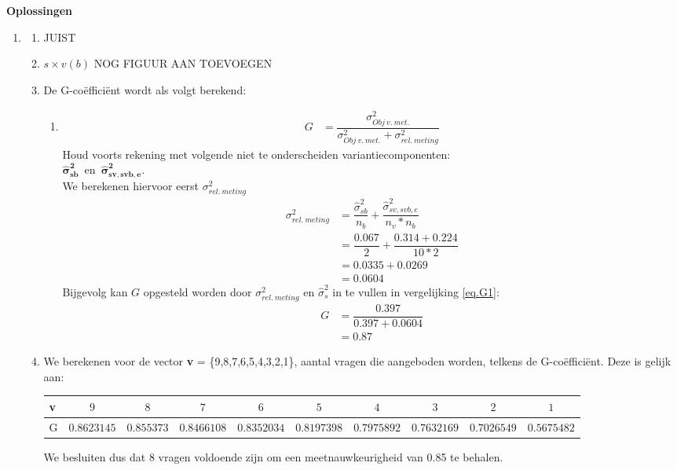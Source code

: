 \OPLOSSING
{
\textbf{Oplossingen}
\begin{enumerate}

\item
\begin{enumerate}
\item JUIST
\item $s \times v(b)$ NOG FIGUUR AAN TOEVOEGEN
\item De G-co\"{e}ffici\"{e}nt wordt als volgt berekend:
\begin{enumerate}
	\item
	\begin{align}
		G &=\dfrac{\sigma^2_{Obj~v.~met.}}{\sigma^2_{Obj~v.~met.}+ \sigma^2_{rel.~meting}} \label{eq.G1}
	\end{align}
	Houd voorts rekening met volgende niet te onderscheiden variantiecomponenten:~ \\
	$ \bm{\hat{\sigma}^2_{sb}} $~en~$\bm{\hat{\sigma}^2_{sv, svb, e} }$.\\
  We berekenen hiervoor eerst $\sigma^2_{rel.~meting}$
  \begin{align*}
    \sigma^2_{rel.~meting} 	&=  \dfrac{\hat{\sigma}^2_{sb}}{n_b} + \dfrac{\hat{\sigma}^2_{sv,svb,e}}{n_v*n_b} \\
                &=  \dfrac{{0.067}}{2} + \dfrac{{0.314 + 0.224}}{10*2}\\
                &= 0.0335 + 0.0269 \\
                &= 0.0604
  \end{align*}
  Bijgevolg kan $G$ opgesteld worden door $\sigma^2_{rel.~meting}$ en $\hat{\sigma}^2_{s}$ in te vullen in vergelijking \ref{eq.G1}:
  \begin{align*}
    G 	&=\dfrac{0.397}{0.397 + 0.0604}\\
      &=0.87
  \end{align*}
\end{enumerate}
\item We berekenen voor de vector \textbf{v} = \{9,8,7,6,5,4,3,2,1\}, aantal vragen die aangeboden worden, telkens de G-co\"{e}ffici\"{e}nt. Deze is gelijk aan:

\begin{center}
\renewcommand{\arraystretch}{1.2}
\hspace*{-3 cm}
\begin{tabular}{|l|c|c|c|c|c|c|c|c|c|} \hline
 \textbf{v} & $ 9 $ & $ 8 $& $ 7 $ & $ 6 $ & $ 5 $ & $ 4 $ & $ 3 $ & $ 2 $ & $ 1 $ \\ \hline
G  & 0.$8623145$ & $0.855373$ & $0.8466108$ & $0.8352034$ & $0.8197398$ & $0.7975892$ & $0.7632169$ & $0.7026549$ & $0.5675482$ \\ \hline
\end{tabular}
\end{center}
We besluiten dus dat 8 vragen voldoende zijn om een meetnauwkeurigheid van 0.85 te behalen.
\end{enumerate}
\end{enumerate}
}


